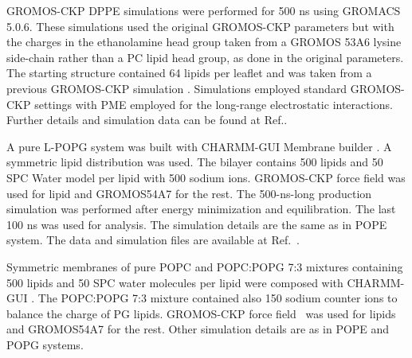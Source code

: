 \documentclass[journal=jpcbfk]{achemso}
\begin{document}

 GROMOS-CKP DPPE simulations were performed for 500 ns using GROMACS 5.0.6. These simulations used the original GROMOS-CKP parameters \cite{piggot11} but with the charges in the ethanolamine head group taken from a GROMOS 53A6 lysine side-chain rather than a PC lipid head group, as done in the original parameters. The starting structure contained 64 lipids per leaflet and was taken from a previous GROMOS-CKP simulation \cite{piggot11}. Simulations employed standard GROMOS-CKP settings with PME employed for the long-range electrostatic interactions. Further details and simulation data can be found at Ref..

A pure L-POPG system was built with CHARMM-GUI Membrane builder \cite{lee16}. A symmetric lipid distribution was used. The bilayer contains 500 lipids and 50 SPC Water model per lipid with 500 sodium ions. GROMOS-CKP force field was used for lipid \cite{piggot11} and GROMOS54A7 \cite{schmid11} for the rest.
The 500-ns-long production simulation was performed after energy minimization and equilibration.
The last 100 ns was used for analysis.
The simulation details are the same as in POPE system.
The data and simulation files are available at Ref.~.


Symmetric membranes of pure POPC and POPC:POPG 7:3 mixtures containing 500 lipids and 50 SPC water molecules per lipid were composed with CHARMM-GUI \cite{lee16}. The POPC:POPG 7:3 mixture contained also 150 sodium counter ions to balance the charge of PG lipids. GROMOS-CKP force field~\cite{piggot11,piggot12} was used for lipids and GROMOS54A7 \cite{schmid11} for the rest. Other simulation details are as in POPE and POPG systems.
\end{document}

